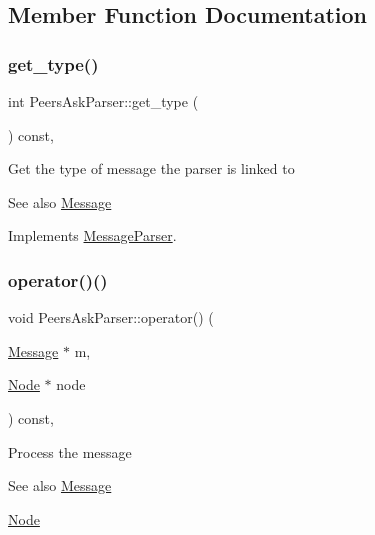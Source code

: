 \subsection{Member Function Documentation}
\mbox{\label{classPeersAskParser_abda1a00fdca208592d3f7e7b039f9ba7}} 
\subsubsection{\texorpdfstring{get\+\_\+type()}{get\_type()}}
{\footnotesize\ttfamily int Peers\+Ask\+Parser\+::get\+\_\+type (\begin{DoxyParamCaption}{ }\end{DoxyParamCaption}) const\hspace{0.3cm}{\ttfamily [final]}, {\ttfamily [virtual]}}

Get the type of message the parser is linked to \begin{DoxySeeAlso}{See also}
\mbox{\hyperlink{classMessage}{Message}} 
\end{DoxySeeAlso}


Implements \mbox{\hyperlink{classMessageParser_aa7c495d7b28a394e5752ca25ffff69d8}{Message\+Parser}}.

\mbox{\label{classPeersAskParser_ac52c9f42fa449029d49faaf9255b2d0d}} 
\subsubsection{\texorpdfstring{operator()()}{operator()()}}
{\footnotesize\ttfamily void Peers\+Ask\+Parser\+::operator() (\begin{DoxyParamCaption}\item[{\mbox{\hyperlink{classMessage}{Message}} $\ast$}]{m,  }\item[{\mbox{\hyperlink{classNode}{Node}} $\ast$}]{node }\end{DoxyParamCaption}) const\hspace{0.3cm}{\ttfamily [final]}, {\ttfamily [virtual]}}

Process the message \begin{DoxySeeAlso}{See also}
\mbox{\hyperlink{classMessage}{Message}} 

\mbox{\hyperlink{classNode}{Node}}
\end{DoxySeeAlso}

